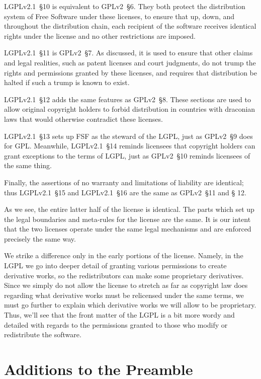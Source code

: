 LGPLv2.1~\S10 is equivalent to GPLv2~\S6. They both protect the
distribution system of Free Software under these licenses, to ensure that
up, down, and throughout the distribution chain, each recipient of the
software receives identical rights under the license and no other
restrictions are imposed.

LGPLv2.1~\S11 is GPLv2~\S7. As discussed, it is used to ensure that
other claims and legal realities, such as patent licenses and court
judgments, do not trump the rights and permissions granted by these
licenses, and requires that distribution be halted if such a trump is
known to exist.

LGPLv2.1~\S12 adds the same features as GPLv2~\S8. These sections are
used to allow original copyright holders to forbid distribution in
countries with draconian laws that would otherwise contradict these
licenses.

LGPLv2.1~\S13 sets up FSF as the steward of the LGPL, just as GPLv2~\S9
does for GPL. Meanwhile, LGPLv2.1~\S14 reminds licensees that copyright
holders can grant exceptions to the terms of LGPL, just as GPLv2~\S10
reminds licensees of the same thing.

Finally, the assertions of no warranty and limitations of liability are
identical; thus LGPLv2.1~\S15 and LGPLv2.1~\S16 are the same as GPLv2~\S11 and \S
12.

As we see, the entire latter half of the license is identical.
The parts which set up the legal boundaries and meta-rules for the license
are the same. It is our intent that the two licenses operate under the
same legal mechanisms and are enforced precisely the same way.

We strike a difference only in the early portions of the license.
Namely, in the LGPL we go into deeper detail of granting various permissions to
create derivative works, so the redistributors can make
some proprietary derivatives. Since we simply do not allow the
license to stretch as far as copyright law does regarding what
derivative works must be relicensed under the same terms, we must go
further to explain which derivative works we will allow to be
proprietary. Thus, we'll see that the front matter of the LGPL is a
bit more wordy and detailed with regards to the permissions granted to
those who modify or redistribute the software.

\section{Additions to the Preamble}

